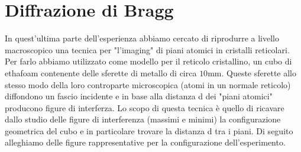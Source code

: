 \documentclass[letterpaper,12pt]{article}
\begin{document}
\section{Diffrazione di Bragg}
In quest'ultima parte dell'esperienza abbiamo cercato di riprodurre a livello macroscopico 
una tecnica per "l'imaging" di piani atomici in cristalli reticolari. Per farlo abbiamo utilizzato come modello per il reticolo cristallino, un cubo di ethafoam 
contenente delle sferette di metallo di circa $10$mm. Queste sferette allo stesso modo della loro controparte microscopica (atomi in un normale reticolo) diffondono un fascio incidente e in base alla distanza d dei "piani atomici" producono figure di interferza.
Lo scopo di questa tecnica è quello di ricavare dallo studio delle figure di interferenza (massimi e minimi) la configurazione geometrica del cubo e in particolare trovare la distanza d tra i piani.
Di seguito alleghiamo delle figure rappresentative per la configurazione dell'esperimento.
\end{document}
